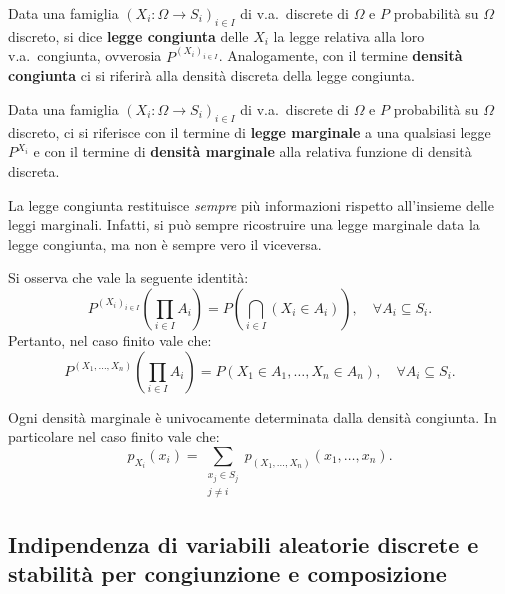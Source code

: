 \begin{multicols*}{2}
\begin{definition}
    Data una famiglia $(X_i : \Omega \to S_i)_{i \in I}$ di
    v.a.~discrete di $\Omega$ e $P$ probabilità su $\Omega$ discreto,
    si dice \textbf{legge congiunta} delle $X_i$
    la legge relativa alla loro v.a.~congiunta, ovverosia
    $P^{(X_i)_{i \in I}}$. Analogamente, con il
    termine \textbf{densità congiunta} ci si riferirà
    alla densità discreta della legge congiunta.
\end{definition}

\begin{definition}
    Data una famiglia $(X_i : \Omega \to S_i)_{i \in I}$ di
    v.a.~discrete di $\Omega$ e $P$ probabilità su $\Omega$ discreto,
    ci si riferisce con il termine di \textbf{legge marginale} a una qualsiasi
    legge $P^{X_i}$ e con il termine di \textbf{densità marginale} alla relativa
    funzione di densità discreta.
\end{definition}

\begin{remark}
    La legge congiunta restituisce \textit{sempre} più informazioni rispetto
    all'insieme delle leggi marginali. Infatti, si può sempre ricostruire una
    legge marginale data la legge congiunta, ma non è sempre vero il
    viceversa. \medskip
\end{remark}

\begin{remark}
    Si osserva che vale la seguente identità:
    \[
        P^{(X_i)_{i \in I}}\left(\prod_{i \in I} A_i\right) = P\left(\bigcap_{i \in I} (X_i \in A_i)\right), \quad \forall A_i \subseteq S_i.
    \]
    Pertanto, nel caso finito vale che:
    \[
        P^{(X_1, \ldots, X_n)}\left(\prod_{i \in I} A_i\right) = P\left(X_1 \in A_1, \ldots, X_n \in A_n\right), \quad \forall A_i \subseteq S_i.
    \]
\end{remark}

\begin{proposition}
    Ogni densità marginale è univocamente determinata dalla densità
    congiunta. In particolare nel caso finito vale che:
    \[
        p_{X_i}(x_i) = \sum_{\substack{x_j \in S_j \\ j \neq i}} p_{(X_1, \ldots, X_n)}(x_1, \ldots, x_n).
    \]
\end{proposition}

\subsection{Indipendenza di variabili aleatorie discrete e stabilità per congiunzione e composizione}


\end{multicols*}
